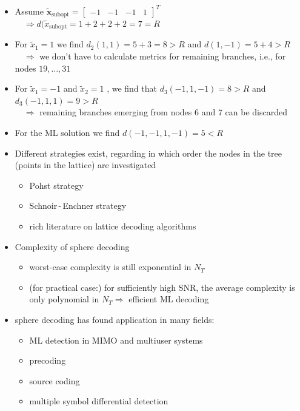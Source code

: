 \documentclass[a4paper, 10pt]{article}
\begin{document}
\begin{itemize}
	\item Assume $\tilde{\mathbf{x}}_{\text{subopt}} = \begin{bmatrix} -1 & -1 & -1 & 1	\end{bmatrix}^T $ \\ $ \quad \Rightarrow d(\tilde{x}_{\text{subopt}} = 1 + 2 + 2 + 2 = 7 = R $
	\item For $\tilde{x}_1 = 1 $ we find $ d_2(1,1) = 5 + 3 = 8 > R $ and $ d(1,-1) = 5 + 4 > R $ \\ $ \quad\Rightarrow $ we don't have to calculate metrics for remaining branches, i.e., for nodes $19, \ldots ,31 $
	\item For $ \tilde{x}_1 = -1 $ and $ \tilde{x}_2 = 1$ , we find that $d_3(-1, 1, -1) = 8 > R $ and $ d_3(-1, 1, 1) = 9 > R$ \\ $ \quad\Rightarrow $ remaining branches emerging from nodes 6 and 7 can be discarded
	\item For the ML solution we find $d(-1, -1, 1, -1) = 5 < R $
	\item Different strategies exist, regarding in which order the nodes in the tree (points in the lattice) are investigated
	\begin{itemize}
		\item Pohst strategy
		\item Schnoir\,-\,Enchner strategy
		\item rich literature on lattice decoding algorithms
	\end{itemize}
	\item Complexity of sphere decoding
	\begin{itemize}
		\item worst-case complexity is still exponential in $N_T$
		\item (for practical case:) for sufficiently high SNR, the average complexity is only polynomial in $N_T \Rightarrow $ efficient ML decoding
	\end{itemize}		
	\item sphere decoding has found application in many fields:
	\begin{itemize}
		\item ML detection in MIMO and multiuser systems
		\item precoding
		\item source coding
		\item multiple symbol differential detection
	\end{itemize}
\end{itemize}
\end{document}
